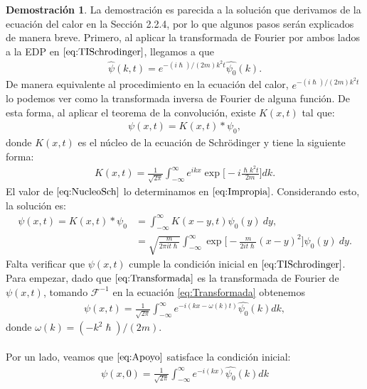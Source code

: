 \documentclass[12pt]{article}
\theoremstyle{definition}
\newtheorem*{demo}{Demostración}
\begin{document}
\begin{demo}
    La demostración es parecida a la solución que derivamos de la ecuación del calor en la Sección 2.2.4, por lo que algunos pasos serán explicados de manera breve. Primero, al aplicar la transformada de Fourier por ambos lados a la EDP en $\eqref{eq:TISchrodinger}$, llegamos a que
    \begin{align}
        \hat{\psi}(k,t) = e^{-(i\hslash)/(2m)k^{2}t}\hat{\psi_{0}}(k). \label{eq:Transformada}
    \end{align}
    De manera equivalente al procedimiento en la ecuación del calor, $e^{-(i\hslash)/(2m)k^{2}t}$ lo podemos ver como la transformada inversa de Fourier de alguna función. De esta forma, al aplicar el teorema de la convolución, existe $K(x,t)$ tal que:
    \begin{align*}
        \psi(x,t) = K(x,t)*\psi_{0},
    \end{align*}
    donde $K(x,t)$ es el núcleo de la ecuación de Schrödinger y tiene la siguiente forma:
    \begin{align}
    K(x,t) = \frac{1}{\sqrt{2\pi}}\int_{-\infty}^{\infty}e^{ikx}\exp\bigg[-i\frac{\hslash k^2t}{2m}\bigg]dk.
    \label{eq:NucleoSch}
\end{align}
    El valor de $\eqref{eq:NucleoSch}$ lo determinamos en $\eqref{eq:Impropia}$.  Considerando esto, la solución es:
    \begin{align*}
        \psi(x,t) = K(x,t)*\psi_{0} & = \int_{-\infty}^{\infty}K(x-y,t)\psi_{0}(y) \: dy ,
        \\
        & = \sqrt{\frac{m}{2\pi it\hslash}}\int_{-\infty}^{\infty}\exp\bigg[-\frac{m}{2it\hslash}(x-y)^2\bigg]\psi_{0}(y) \: dy.
    \end{align*}
    Falta verificar que $\psi(x,t)$ cumple la condición inicial en $\eqref{eq:TISchrodinger}$. Para empezar, dado que $\eqref{eq:Transformada}$ es la transformada de Fourier de $\psi(x,t)$, tomando $\mathcal{F}^{-1}$ en la ecuación \eqref{eq:Transformada} obtenemos
    \begin{align}
        \psi(x,t) =    \frac{1}{\sqrt{2\pi}} \int^{\infty}_{-\infty}e^{-i(kx-\omega(k)t)}\hat{\psi_{0}}(k)dk,
        \label{eq:Apoyo}
    \end{align}
    donde $\omega(k) = (-k^2\hslash)/(2m)$.
    \\ \\ 
    Por un lado, veamos que $\eqref{eq:Apoyo}$ satisface la condición inicial:
    \begin{align*}
         \psi(x,0)  
         = \frac{1}{\sqrt{2\pi}} \int^{\infty}_{-\infty}e^{-i(kx)}\hat{\psi_{0}}(k)dk

\end{align*}
\end{demo}
\end{document}
